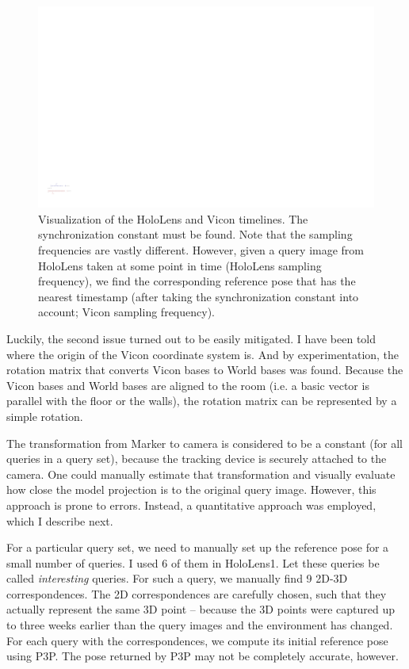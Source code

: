 \documentclass[twoside]{ctuthesis}
\theoremstyle{plain}
\theoremstyle{definition}
\theoremstyle{note}
\begin{document}
\begin{figure}
	\centering
 	\includegraphics[width=1.0\textwidth]{HL_and_vicon_time}
 	\caption{Visualization of the HoloLens and Vicon timelines. The synchronization constant must be found. Note that the sampling frequencies are vastly different. However, given a query image from HoloLens taken at some point in time (HoloLens sampling frequency), we find the corresponding reference pose that has the nearest timestamp (after taking the synchronization constant into account; Vicon sampling frequency).}
 	\label{fig:HL_and_vicon_time}
\end{figure} 

Luckily, the second issue turned out to be easily mitigated. I have been told where the origin of the Vicon coordinate system is. And by experimentation, the rotation matrix that converts Vicon bases to World bases was found. Because the Vicon bases and World bases are aligned to the room (i.e. a basic vector is parallel with the floor or the walls), the rotation matrix can be represented by a simple rotation.

The transformation from Marker to camera is considered to be a constant (for all queries in a query set), because the tracking device is securely attached to the camera. One could manually estimate that transformation and visually evaluate how close the model projection is to the original query image. However, this approach is prone to errors. Instead, a quantitative approach was employed, which I describe next.

For a particular query set, we need to manually set up the reference pose for a small number of queries. I used 6 of them in HoloLens1. Let these queries be called \emph{interesting} queries. For such a query, we manually find 9 2D-3D correspondences. The 2D correspondences are carefully chosen, such that they actually represent the same 3D point -- because the 3D points were captured up to three weeks earlier than the query images and the environment has changed. For each query with the correspondences, we compute its initial reference pose using P3P. The pose returned by P3P may not be completely accurate, however.
\end{document}
